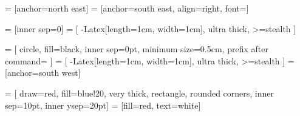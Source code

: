 
\usepackage{mwe}
\usepackage{blindtext}
\usepackage{relsize}
\usetikzlibrary{positioning	}
\usetikzlibrary{arrows.meta}
\usetikzlibrary{calc}


\newcommand{\macrocolor}{red}
\newcommand{\microcolor}{blue}
\newcommand{\macrotext}[1]{\color{\macrocolor}#1}
\newcommand{\microtext}[1]{\color{\microcolor}#1}
\newcommand{\black}[1]{\color{black}#1}

\newcommand{\FIGWIDTH}{17cm} %
\newcommand{\FIGHEIGHT}{12cm} %
\newcommand{\VERTFIGSEP}{4cm} %
\newcommand{\HORFIGSEP}{4cm} %
 = [anchor=north east]
 = [anchor=south east, align=right, font=\footnotesize]

 = [inner sep=0]
 = [
		-{Latex[length=1cm, width=1cm]},
		ultra thick,
		>=stealth
]

 = [
		circle,
		fill=black,
		inner sep=0pt,
		minimum size=0.5cm,
		prefix after command= {}
]
 = [
		-{Latex[length=1cm, width=1cm]},
		ultra thick,
		>=stealth
]
 = [anchor=south west]
\newcommand{\PPWIDTH}{2cm}
\newcommand{\PPHEIGHT}{2cm}

 = [
		draw=red,
		fill=blue!20,
		very thick,
    rectangle,
		rounded corners,
		inner sep=10pt,
		inner ysep=20pt]
 = [fill=red, text=white]

\newcommand{\xo}{\bigotimes}
\newcommand{\includedimensions}[1]{}
